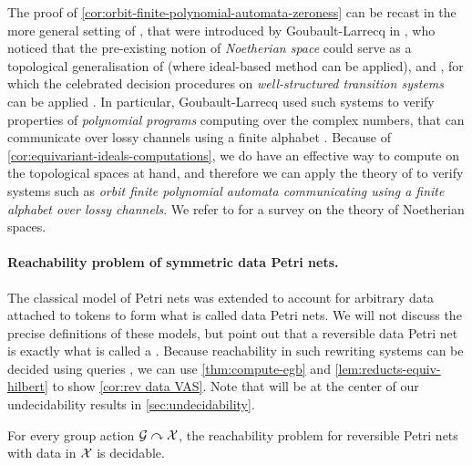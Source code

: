 \begin{remark}
  \label{rem:topological-wsts}
  The proof of \cref{cor:orbit-finite-polynomial-automata-zeroness} can be
  recast in the more general setting of 
  , that were introduced by
  Goubault-Larrecq in \cite{JGL07}, who noticed that the pre-existing notion of
  \emph{Noetherian space} could serve as a topological generalisation of
   (where ideal-based method can be applied),
  and 
  , for which the celebrated decision procedures on
  \emph{well-structured transition systems} can be applied \cite{ABDU96}. In particular,
  Goubault-Larrecq used such systems to verify properties of \emph{polynomial
  programs} computing over the complex numbers, that can communicate over lossy
  channels using a finite alphabet \cite{JGL10}. 
  Because of \cref{cor:equivariant-ideals-computations}, we do have an 
  effective way to compute on the topological spaces at hand, 
  and therefore we can apply the theory of
   to verify systems
  such as \emph{orbit finite polynomial automata communicating using a finite alphabet
  over lossy channels}.
  We refer to \cite[Chapter 9]{JGL13} for a survey on the theory of 
  Noetherian spaces.
\end{remark}


\paragraph{Reachability problem of symmetric data Petri nets.} The classical
model of Petri nets was extended to account for arbitrary data attached to
tokens to form what is called data Petri nets. We will not discuss the precise
definitions of these models, but point out  that a reversible data Petri net is
exactly what is called a  \cite[Section
8]{GHOLAS24}. Because reachability in such rewriting systems can be decided
using  queries \cite[Theorem 64]{GHOLAS24}, we
can use \cref{thm:compute-egb} and \cref{lem:reducts-equiv-hilbert} to show
\cref{cor:rev data VAS}. Note that  will be at the
center of our undecidability results in \cref{sec:undecidability}.

\begin{corollary}\label{cor:rev data VAS}
  For every  group action $\mathcal{G}\curvearrowright\mathcal{X}$,
  the reachability problem for reversible Petri nets with data in $\mathcal{X}$ is decidable.
\end{corollary}



